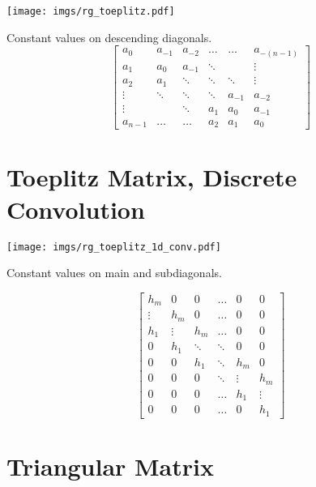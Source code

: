\begin{center}
\texttt{[image: imgs/rg\_toeplitz.pdf]}
\end{center}
Constant values on descending diagonals.
\begin{equation}
\begin{bmatrix}
  a_{0} & a_{-1} & a_{-2} & \ldots  & \ldots & a_{-(n-1)}  \\
  a_{1} & a_0    & a_{-1} & \ddots  &        & \vdots \\
  a_{2} & a_{1}  & \ddots & \ddots  & \ddots & \vdots \\ 
 \vdots & \ddots & \ddots & \ddots  & a_{-1} & a_{-2}\\
 \vdots &        & \ddots & a_{1}   & a_{0}  & a_{-1} \\
a_{n-1} & \ldots & \ldots & a_{2}   & a_{1}  & a_{0}
\end{bmatrix}
\end{equation}


\section{Toeplitz Matrix, Discrete Convolution}

\begin{center}
\texttt{[image: imgs/rg\_toeplitz\_1d\_conv.pdf]}
\end{center}

Constant values on main and subdiagonals.

\begin{equation}
\begin{bmatrix}
  h_m &   0 &   0 &      \hdots &   0 &   0 \\
  \vdots & h_m &   0 &   \hdots &   0 &   0 \\
  h_1 & \vdots & h_m &   \hdots &   0 &   0 \\
    0 & h_1 & \ddots & \ddots &   0 &   0 \\
    0 &   0 & h_1 &    \ddots & h_m &   0 \\
    0 &   0 &   0 &    \ddots & \vdots & h_m \\
    0 &   0 &   0 &      \hdots & h_1 & \vdots \\
    0 &   0 &   0 &      \hdots &   0 & h_1 
\end{bmatrix}
\end{equation}


\section{Triangular Matrix}

